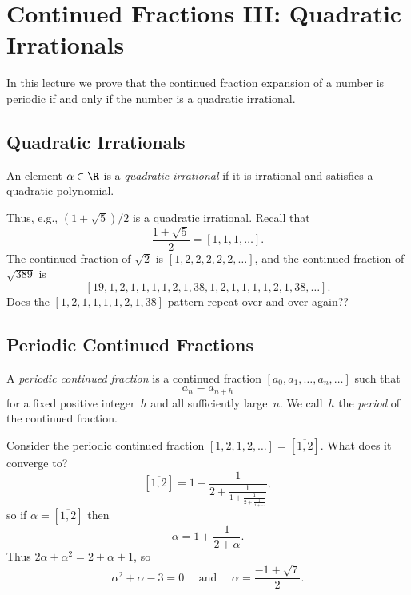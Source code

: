 \documentclass[11pt]{report}
\begin{document}
\chapter{Continued Fractions III: Quadratic Irrationals}



In this lecture we prove that the continued fraction expansion of
a number is periodic if and only if the number is a quadratic irrational.

\section{Quadratic Irrationals}
\begin{definition}
  An element $\alpha\in\R$ is a {\em quadratic irrational}
  if it is irrational and satisfies a quadratic polynomial.
\end{definition}
Thus, e.g., $(1+\sqrt{5})/2$ is a quadratic irrational.
Recall that
$$
  \frac{1+\sqrt{5}}{2} = [1,1,1,\ldots].
$$
The continued fraction of $\sqrt{2}$ is $[1,2,2,2,2,2,\ldots]$, and
the continued fraction of $\sqrt{389}$ is
$$
  [19,1,2,1, 1, 1, 1, 2, 1, 38, 1, 2, 1, 1, 1, 1, 2, 1, 38,\ldots].$$
Does the $[1,2,1, 1, 1, 1, 2, 1, 38]$ pattern repeat over and over again??

\section{Periodic Continued Fractions}
\begin{definition}
  A {\em periodic continued fraction} is a continued
  fraction $[a_0, a_1, \ldots, a_n, \ldots]$ such that
  $$
    a_n = a_{n+h}
  $$
  for a fixed positive integer~$h$ and all sufficiently large~$n$.
  We call~$h$ the {\em period} of the continued fraction.
\end{definition}

\begin{example}
  Consider the periodic continued fraction $[1,2,1,2,\ldots] = [\overline{1,2}]$.
  What does it converge to?
  $$[\overline{1,2}] = 1+\frac{1}{2+\frac{1}{1+\frac{1}{2+ \frac{1}{1+\cdots}}}},$$
  so if $\alpha=[\overline{1,2}]$ then
  $$
    \alpha = 1 + \frac{1}{2+\alpha}.
  $$
  Thus $2\alpha + \alpha^2 = 2 + \alpha + 1$, so
  $$
    \alpha^2 + \alpha - 3 = 0
    \quad\text{ and }\quad \alpha = \frac{-1+\sqrt{7}}{2}.
  $$
\end{example}
\end{document}
